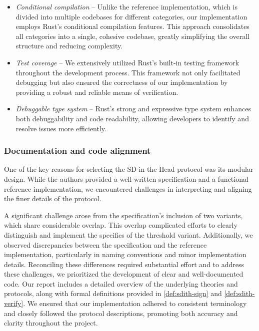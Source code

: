 \documentclass[11pt]{report}
\theoremstyle{definition}
\theoremstyle{plain}
\begin{document}
\begin{itemize}
  \item \textit{Conditional compilation} -- Unlike the reference implementation, which is divided into multiple codebases for different categories, our implementation employs Rust's conditional compilation features. This approach consolidates all categories into a single, cohesive codebase, greatly simplifying the overall structure and reducing complexity.
  \item \textit{Test coverage} -- We extensively utilized Rust's built-in testing framework throughout the development process. This framework not only facilitated debugging but also ensured the correctness of our implementation by providing a robust and reliable means of verification.
  \item \textit{Debuggable type system} -- Rust's strong and expressive type system enhances both debuggability and code readability, allowing developers to identify and resolve issues more efficiently.
\end{itemize}

\subsubsection{Documentation and code alignment}

One of the key reasons for selecting the SD-in-the-Head protocol was its modular design. While the authors provided a well-written specification and a functional reference implementation, we encountered challenges in interpreting and aligning the finer details of the protocol.

A significant challenge arose from the specification's inclusion of two variants, which share considerable overlap. This overlap complicated efforts to clearly distinguish and implement the specifics of the threshold variant. Additionally, we observed discrepancies between the specification and the reference implementation, particularly in naming conventions and minor implementation details. Reconciling these differences required substantial effort and to address these challenges, we prioritized the development of clear and well-documented code. Our report includes a detailed overview of the underlying theories and protocols, along with formal definitions provided in \autoref{def:sdith-sign} and \autoref{def:sdith-verify}. We ensured that our implementation adhered to consistent terminology and closely followed the protocol descriptions, promoting both accuracy and clarity throughout the project.
\end{document}
